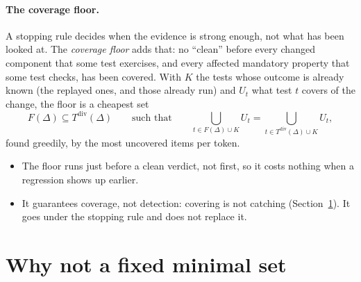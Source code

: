 \documentclass[11pt,a4paper]{article}
\newcommand{\Tdiv}{T^{\mathrm{div}}(\Delta)}
\begin{document}
\paragraph{The coverage floor.} A stopping rule decides when the evidence is strong enough, not what has been
looked at. The \emph{coverage floor} adds that: no ``clean'' before every changed component that some test
exercises, and every affected mandatory property that some test checks, has been covered. With $K$ the tests whose
outcome is already known (the replayed ones, and those already run) and $U_t$ what test $t$ covers of the change,
the floor is a cheapest set
\[
  F(\Delta) \subseteq \Tdiv \qquad \text{such that} \qquad \bigcup_{t \in F(\Delta) \cup K} U_t = \bigcup_{t \in
  \Tdiv \cup K} U_t ,
\]
found greedily, by the most uncovered items per token.
\begin{itemize}
  \item The floor runs just before a clean verdict, not first, so it costs nothing when a regression shows up
        earlier.
  \item It guarantees coverage, not detection: covering is not catching (Section~\ref{sec:minimal}). It goes
        under the stopping rule and does not replace it.
\end{itemize}

\section{Why not a fixed minimal set}
\label{sec:minimal}
\end{document}
